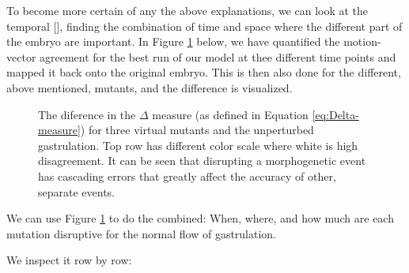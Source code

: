 To become more certain of any the above explanations, we can look at the temporal [], finding the combination of time and space where the different part of the embryo are important. In Figure \ref{fig:compare-motionAgreement-space} below, we have quantified the motion-vector agreement for the best run of our model at thee different time points and mapped it back onto the original embryo. This is then also done for the different, above mentioned, mutants, and the difference is visualized. 
\begin{figure}[H]
    \centering
    \caption{The diference in the $\Delta$ measure (as defined in Equation \ref{eq:Delta-measure}) for three virtual mutants and the unperturbed gastrulation. Top row has different color scale where white is high disagreement. 
    It can be seen that disrupting a morphogenetic event has cascading errors that greatly affect the accuracy of other, separate events.}
    \label{fig:compare-motionAgreement-space}
\end{figure}
\newpage

We can use Figure \ref{fig:compare-motionAgreement-space} to do the combined: When, where, and how much are each mutation disruptive for the normal flow of gastrulation. 

We inspect it row by row:

